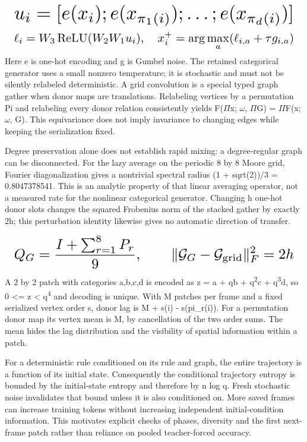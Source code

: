 \documentclass[10pt,letterpaper,twocolumn]{article}
\begin{document}
\begin{equation}
\resizebox{.98\columnwidth}{!}{$\displaystyle u_i=[e(x_i);e(x_{\pi_1(i)});\ldots;e(x_{\pi_d(i)})]$}
\end{equation}
\begin{equation}
\resizebox{.98\columnwidth}{!}{$\displaystyle \ell_i=W_3\operatorname{ReLU}(W_2W_1u_i),\quad x_i^+=\arg\max_a(\ell_{i,a}+\tau g_{i,a})$}
\end{equation}
Here e is one-hot encoding and g is Gumbel noise. The retained categorical generator uses a small nonzero temperature; it is stochastic and must not be silently relabeled deterministic. A grid convolution is a special typed graph gather when donor maps are translations. Relabeling vertices by a permutation Pi and relabeling every donor relation consistently yields F(\ensuremath{\Pi}x; \ensuremath{\omega}, \ensuremath{\Pi}G) = \ensuremath{\Pi}F(x; \ensuremath{\omega}, G). This equivariance does not imply invariance to changing edges while keeping the serialization fixed.

Degree preservation alone does not establish rapid mixing: a degree-regular graph can be disconnected. For the lazy average on the periodic 8 by 8 Moore grid, Fourier diagonalization gives a nontrivial spectral radius (1 + sqrt(2))/\allowbreak{}3 = 0.8047378541. This is an analytic property of that linear averaging operator, not a measured rate for the nonlinear categorical generator. Changing h one-hot donor slots changes the squared Frobenius norm of the stacked gather by exactly 2h; this perturbation identity likewise gives no automatic direction of transfer.

\begin{equation}
\resizebox{.98\columnwidth}{!}{$\displaystyle Q_G=\frac{I+\sum_{r=1}^{8}P_r}{9},\qquad \|\mathcal{G}_G-\mathcal{G}_{\rm grid}\|_F^2=2h$}
\end{equation}
A 2 by 2 patch with categories a,b,c,d is encoded as z = a + qb + q\textsuperscript{2}c + q\textsuperscript{3}d, so 0 <= z < q\textsuperscript{4} and decoding is unique. With M patches per frame and a fixed serialized vertex order s, donor lag is M + s(i) - s(pi\_\allowbreak{}r(i)). For a permutation donor map its vertex mean is M, by cancellation of the two order sums. The mean hides the lag distribution and the visibility of spatial information within a patch.

For a deterministic rule conditioned on its rule and graph, the entire trajectory is a function of its initial state. Consequently the conditional trajectory entropy is bounded by the initial-state entropy and therefore by n log q. Fresh stochastic noise invalidates that bound unless it is also conditioned on. More saved frames can increase training tokens without increasing independent initial-condition information. This motivates explicit checks of phases, diversity and the first next-frame patch rather than reliance on pooled teacher-forced accuracy.
\end{document}
